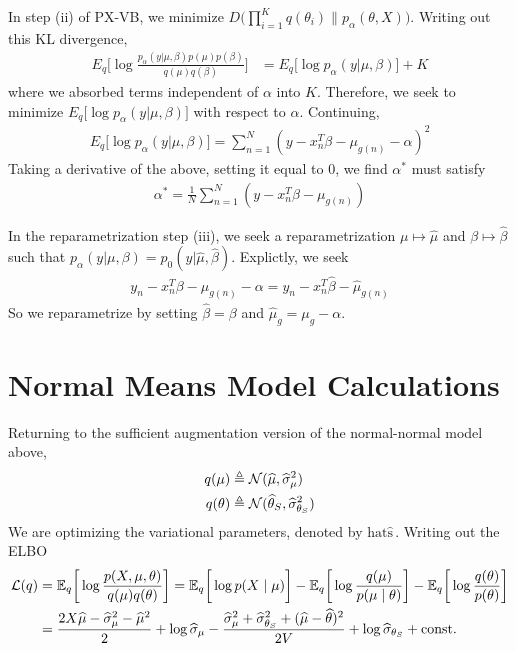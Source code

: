 \documentclass{article}
\begin{document}
In step (ii) of PX-VB, we minimize $D\big( \prod_{i=1}^K q(\theta_i) \| p_{\alpha}(\theta, X) \big)$. Writing out this KL divergence, 
\begin{align}
E_q\Big[ \log \frac{p_\alpha(y|\mu, \beta) p(\mu)p(\beta)}{q(\mu)q(\beta)}\Big] &= E_q\Big[\log p_\alpha(y|\mu, \beta)\Big] + K
\end{align}
where we absorbed terms independent of $\alpha$ into $K$. Therefore, we seek to minimize $E_q\Big[\log p_\alpha(y|\mu, \beta)\Big]$ with respect to $\alpha$. Continuing, 
\begin{align}
E_q\Big[\log p_\alpha(y|\mu, \beta)\Big] = \sum_{n=1}^N (y - x_n^T\beta - \mu_{g(n)} - \alpha)^2
\end{align}
Taking a derivative of the above, setting it equal to 0, we find $\alpha^*$ must satisfy 
\begin{align}
\alpha^* = \frac{1}{N}
\sum_{n=1}^N (y - x_n^T\beta - \mu_{g(n)})  
\end{align}

In the reparametrization step (iii), we seek a reparametrization $\mu\mapsto \hat\mu$ and $\beta\mapsto \hat\beta$ such that $p_\alpha(y | \mu, \beta) = p_0(y | \hat\mu,\hat\beta)$. Explictly, we seek 
\begin{align}
y_n - x_n^T \beta - \mu_{g(n)} - \alpha = y_n - x_n^T \hat\beta - \hat\mu_{g(n)} 
\end{align}
So we reparametrize by setting $\hat\beta = \beta$ and $\hat\mu_g = \mu_g - \alpha$. 

\newpage

\section{Normal Means Model Calculations}
\label{normal}

 Returning to the sufficient augmentation version of the normal-normal model above, 
\begin{align}
q(\mu)
&\triangleq \mathcal{N}(\widehat\mu,\widehat\sigma_\mu^2) \\
q(\theta)
&\triangleq \mathcal{N}(\widehat\theta_S,\widehat\sigma_{\theta_S}^2)
\end{align}
We are optimizing the variational parameters, denoted by $\text{hat}\widehat{\text{s}}\,$. Writing out the ELBO
\begin{align}
\cl(q)
&=\EE_{q}\bigg[\log \frac{p(X,\mu,\theta)}{q(\mu)q(\theta)}\bigg] 
=  \EE_{q}\bigg[\log p(X\mid \mu)\bigg]
-  \EE_{q}\bigg[\log\frac{q(\mu)}{p(\mu\mid \theta)} \bigg]
-  \EE_{q}\bigg[\log \frac{q(\theta)}{p(\theta)}\bigg] \\
&=  \frac{2X\widehat\mu -  \widehat\sigma_{\mu}^{2} - \widehat\mu^{2}}{2} %
+\log\widehat\sigma_\mu - \frac{\widehat\sigma_\mu^{2}+\widehat\sigma_{\theta_S}^{2} + (\widehat\mu-\widehat\theta)^2}{2V}
+\log \widehat{\sigma}_{\theta_S} 
+ \text{const.}
\end{align}
\end{document}
